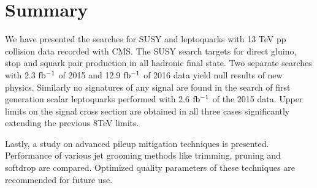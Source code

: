 \section{Summary}

We have presented the searches for SUSY and leptoquarks with 13 TeV pp collision data recorded with CMS. The SUSY search targets for direct gluino, stop and squark pair production in all hadronic final state. Two separate searches with 2.3 $\rm fb^{-1}$ of 2015 and 12.9 $\rm fb^{-1}$ of 2016 data yield null results of new physics. Similarly no signatures of any signal are found in the search of  first generation scalar leptoquarks performed with 2.6 $\rm fb^{-1}$ of the 2015 data. Upper limits on the signal cross section  are obtained in all three cases significantly extending the previous 8TeV limits.   

Lastly, a study on advanced pileup mitigation techniques is presented. Performance of various jet grooming methods like trimming, pruning and softdrop are compared. Optimized quality parameters of these techniques are recommended for future use.   



\newpage

%
%








\clearpage






